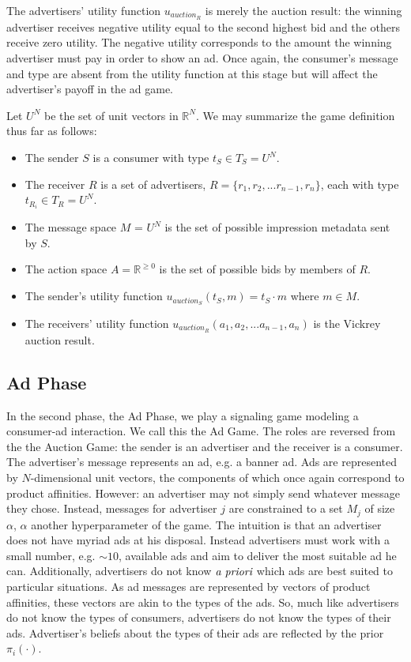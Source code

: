 \documentclass{article}
\begin{document}
The advertisers' utility function $u_{auction_R}$ is merely the auction result: the winning advertiser receives negative utility equal to the second highest bid and the others receive zero utility. The negative utility corresponds to the amount the winning advertiser must pay in order to show an ad. Once again, the consumer's message and type are absent from the utility function at this stage but will affect the advertiser's payoff in the ad game.

Let $U^N$ be the set of unit vectors in $\mathbb{R}^N$. We may summarize the game definition thus far as follows:

\begin{itemize}
	\item The sender $S$ is a consumer with type $t_S \in T_S = U^N$.
	\item The receiver $R$ is a set of advertisers, $R = \{r_1, r_2, ... r_{n-1}, r_n \}$, each with type $t_{R_i} \in T_R = U^N$.
	\item The message space $M$ = $U^N$ is the set of possible impression metadata sent by $S$.
	\item The action space $A = \mathbb{R}^{\ge 0}$ is the set of possible bids by members of $R$.
	\item The sender's utility function $u_{auction_S}(t_S, m) = t_S \cdot m$ where $m \in M$.
	\item The receivers' utility function $u_{auction_R}(a_1, a_2, ... a_{n-1}, a_n)$ is the Vickrey auction result.
\end{itemize}

\subsection{Ad Phase}

In the second phase, the Ad Phase, we play a signaling game modeling a consumer-ad interaction. We call this the Ad Game. The roles are reversed from the the Auction Game: the sender is an advertiser and the receiver is a consumer. The advertiser's message represents an ad, e.g. a banner ad. Ads are represented by $N$-dimensional unit vectors, the components of which once again correspond to product affinities. However: an advertiser may not simply send whatever message they chose. Instead, messages for advertiser $j$ are constrained to a set $M_j$ of size $\alpha$, $\alpha$ another hyperparameter of the game. The intuition is that an advertiser does not have myriad ads at his disposal. Instead advertisers must work with a small number, e.g. $\sim 10$, available ads and aim to deliver the most suitable ad he can. Additionally, advertisers do not know $\emph{a priori}$ which ads are best suited to particular situations. As ad messages are represented by vectors of product affinities, these vectors are akin to the types of the ads. So, much like advertisers do not know the types of consumers, advertisers do not know the types of their ads. Advertiser's beliefs about the types of their ads are reflected by the prior $\pi_i(\cdot)$.
\end{document}
